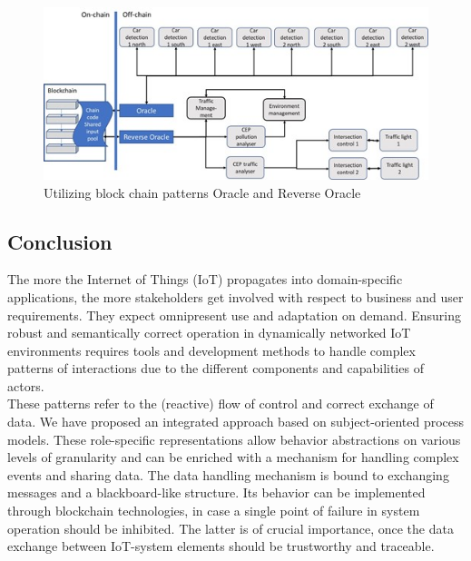 \begin{figure}[htbp]
	\centering
	\includegraphics[width=0.7\linewidth]{Figures/Chapter5/figuresshared/Block-Chain.jpg}
	\caption[Utilizing block chain patterns Oracle and Reverse Oracle]{Utilizing block chain patterns Oracle and Reverse Oracle}
	\label{fig:sharedblockchain}
\end{figure}

\subsection {Conclusion}
The more the Internet of Things (IoT) propagates into domain-specific applications, the more stakeholders get involved with respect to business and user requirements. They expect omnipresent use and adaptation on demand. Ensuring robust and semantically correct operation in dynamically networked IoT environments requires tools and development methods to handle complex patterns of interactions due to the different components and capabilities of actors.\\
These patterns refer to the (reactive) flow of control and correct exchange of data. We have proposed an integrated approach based on subject-oriented process models. These role-specific representations allow behavior abstractions on various levels of granularity and can be enriched with a mechanism for handling complex events and sharing data. The data handling mechanism is bound to exchanging messages and a blackboard-like structure. Its behavior can be implemented through blockchain technologies, in case a single point of failure in system operation should be inhibited. The latter is of crucial importance, once the data exchange between IoT-system elements should be trustworthy and traceable.\\
